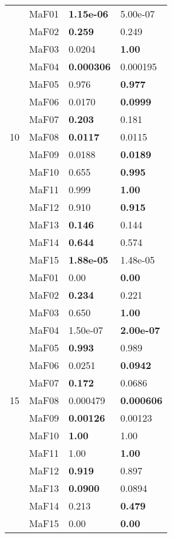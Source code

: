 \documentclass[]{article}
\begin{document}
\begin{table}
\begin{footnotesize}
\begin{tabular}{|l|l|l|l|}
\multirow{15}{*}{10} & MaF01 & \cellcolor{gray95} {\bf 1.15e-06} & \cellcolor{gray95} 5.00e-07\\
 & MaF02 & \cellcolor{gray95} {\bf 0.259} & 0.249\\
 & MaF03 & 0.0204 & \cellcolor{gray95} {\bf 1.00}\\
 & MaF04 & \cellcolor{gray95} {\bf 0.000306} & 0.000195\\
 & MaF05 & 0.976 & \cellcolor{gray95} {\bf 0.977}\\
 & MaF06 & 0.0170 & \cellcolor{gray95} {\bf 0.0999}\\
 & MaF07 & \cellcolor{gray95} {\bf 0.203} & 0.181\\
 & MaF08 & \cellcolor{gray95} {\bf 0.0117} & 0.0115\\
 & MaF09 & \cellcolor{gray95} 0.0188 & \cellcolor{gray95} {\bf 0.0189}\\
 & MaF10 & 0.655 & \cellcolor{gray95} {\bf 0.995}\\
 & MaF11 & 0.999 & \cellcolor{gray95} {\bf 1.00}\\
 & MaF12 & \cellcolor{gray95} 0.910 & \cellcolor{gray95} {\bf 0.915}\\
 & MaF13 & \cellcolor{gray95} {\bf 0.146} & 0.144\\
 & MaF14 & \cellcolor{gray95} {\bf 0.644} & \cellcolor{gray95} 0.574\\
 & MaF15 & \cellcolor{gray95} {\bf 1.88e-05} & \cellcolor{gray95} 1.48e-05\\
\hline

\multirow{15}{*}{15} & MaF01 & \cellcolor{gray95} 0.00 & \cellcolor{gray95} {\bf 0.00}\\
 & MaF02 & \cellcolor{gray95} {\bf 0.234} & 0.221\\
 & MaF03 & 0.650 & \cellcolor{gray95} {\bf 1.00}\\
 & MaF04 & \cellcolor{gray95} 1.50e-07 & \cellcolor{gray95} {\bf 2.00e-07}\\
 & MaF05 & \cellcolor{gray95} {\bf 0.993} & \cellcolor{gray95} 0.989\\
 & MaF06 & 0.0251 & \cellcolor{gray95} {\bf 0.0942}\\
 & MaF07 & \cellcolor{gray95} {\bf 0.172} & 0.0686\\
 & MaF08 & \cellcolor{gray95} 0.000479 & \cellcolor{gray95} {\bf 0.000606}\\
 & MaF09 & \cellcolor{gray95} {\bf 0.00126} & 0.00123\\
 & MaF10 & \cellcolor{gray95} {\bf 1.00} & \cellcolor{gray95} 1.00\\
 & MaF11 & 1.00 & \cellcolor{gray95} {\bf 1.00}\\
 & MaF12 & \cellcolor{gray95} {\bf 0.919} & 0.897\\
 & MaF13 & \cellcolor{gray95} {\bf 0.0900} & \cellcolor{gray95} 0.0894\\
 & MaF14 & 0.213 & \cellcolor{gray95} {\bf 0.479}\\
 & MaF15 & \cellcolor{gray95} 0.00 & \cellcolor{gray95} {\bf 0.00}\\
\hline
\end{tabular}
\end{footnotesize}
\end{table}
\end{document}
